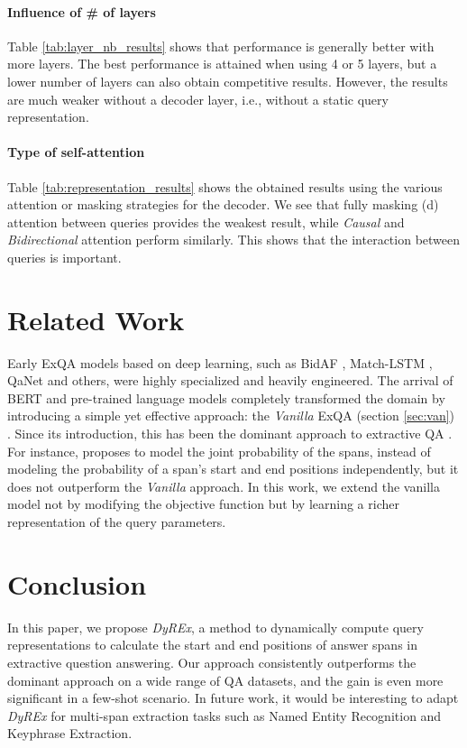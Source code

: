 \documentclass{article}
\begin{document}
\paragraph{Influence of \# of layers} Table \ref{tab:layer_nb_results} shows that performance is generally better with more layers. The best performance is attained when using 4 or 5 layers, but a lower number of layers can also obtain competitive results. However, the results are much weaker without a decoder layer, i.e., without a static query representation.

\paragraph{Type of self-attention} Table \ref{tab:representation_results} shows the obtained results using the various attention or masking strategies for the decoder. We see that fully masking (d) attention between queries provides the weakest result, while \textit{Causal} and \textit{Bidirectional} attention perform similarly. This shows that the interaction between queries is important.

\section{Related Work}
\label{sec:related_work}

Early ExQA models based on deep learning, such as BidAF \citep{bidaf}, Match-LSTM \citep{Match-LSTM}, QaNet \citep{QaNet} and others, were highly specialized and heavily engineered. The arrival of BERT and pre-trained language models completely transformed the domain by introducing a simple yet effective approach: the \textit{Vanilla} ExQA (section \ref{sec:van}) \citep{BERT}. Since its introduction, this has been the dominant approach to extractive QA \citep{RoBERTa, span_BERT}. For instance, \citep{Fajcik2021RethinkingTO} proposes to model the joint probability of the spans, instead of modeling the probability of a span’s start and end positions independently, but it does not outperform the \textit{Vanilla} approach. In this work, we extend the vanilla model not by modifying the objective function but by learning a richer representation of the query parameters.

\section{Conclusion}
In this paper, we propose \textit{DyREx}, a method to dynamically compute query representations to calculate the start and end positions of answer spans in extractive question answering. Our approach consistently outperforms the dominant approach on a wide range of QA datasets, and the gain is even more significant in a few-shot scenario. In future work, it would be interesting to adapt \textit{DyREx} for multi-span extraction tasks such as Named Entity Recognition and Keyphrase Extraction.
\end{document}
